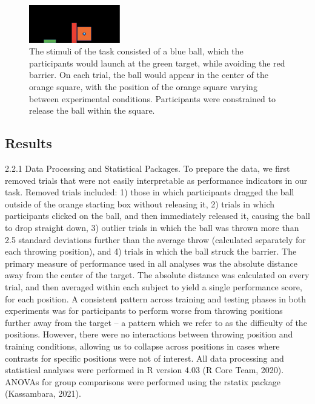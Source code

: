 \documentclass[
  jou, donotrepeattitle,floatsintext]{apa7}
\begin{document}
\begin{figure}
\includegraphics[width=1.56in]{Assets/methodsFig1} \caption{The stimuli of the task consisted of a blue ball, which the participants would launch at the green target, while avoiding the red barrier. On each trial, the ball would appear in the center of the orange square, with the position of the orange square varying between experimental conditions. Participants were constrained to release the ball within the square.}\label{fig:Task}
\end{figure}

\hypertarget{results}{%
\subsection{Results}\label{results}}

2.2.1 Data Processing and Statistical Packages. To prepare the data, we first removed trials that were not easily interpretable as performance indicators in our task. Removed trials included: 1) those in which participants dragged the ball outside of the orange starting box without releasing it, 2) trials in which participants clicked on the ball, and then immediately released it, causing the ball to drop straight down, 3) outlier trials in which the ball was thrown more than 2.5 standard deviations further than the average throw (calculated separately for each throwing position), and 4) trials in which the ball struck the barrier.
The primary measure of performance used in all analyses was the absolute distance away from the center of the target. The absolute distance was calculated on every trial, and then averaged within each subject to yield a single performance score, for each position. A consistent pattern across training and testing phases in both experiments was for participants to perform worse from throwing positions further away from the target -- a pattern which we refer to as the difficulty of the positions. However, there were no interactions between throwing position and training conditions, allowing us to collapse across positions in cases where contrasts for specific positions were not of interest. All data processing and statistical analyses were performed in R version 4.03 (R Core Team, 2020). ANOVAs for group comparisons were performed using the rstatix package (Kassambara, 2021).
\end{document}
